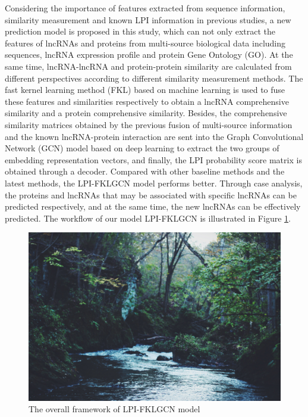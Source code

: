 \documentclass[fleqn,10pt]{wlscirep}
\begin{document}
Considering the importance of features extracted from sequence information, similarity measurement and known LPI information in previous studies, a new prediction model is proposed in this study, which can not only extract the features of lncRNAs and proteins from multi-source biological data including sequences, lncRNA expression profile and protein Gene Ontology (GO). At the same time, lncRNA-lncRNA and protein-protein similarity are calculated from different perspectives according to different similarity measurement methods. The fast kernel learning method (FKL) based on machine learning is used to fuse these features and similarities respectively to obtain a lncRNA comprehensive similarity and a protein comprehensive similarity. Besides, the comprehensive similarity matrices obtained by the previous fusion of multi-source information and the known lncRNA-protein interaction are sent into the Graph Convolutional Network (GCN) model based on deep learning to extract the two groups of embedding representation vectors, and finally, the LPI probability score matrix is obtained through a decoder. Compared with other baseline methods and the latest methods, the LPI-FKLGCN model performs better. Through case analysis, the proteins and lncRNAs that may be associated with specific lncRNAs can be predicted respectively, and at the same time, the new lncRNAs can be effectively predicted. The workflow of our model LPI-FKLGCN is illustrated in Figure \ref{fig:fig1}.

\begin{figure}[ht]
\centering
\graphicspath{ {./images/} }
\includegraphics[width=\textwidth]{stream.jpg}
\caption{The overall framework of LPI-FKLGCN model}
\label{fig:fig1}
\end{figure}
\end{document}
